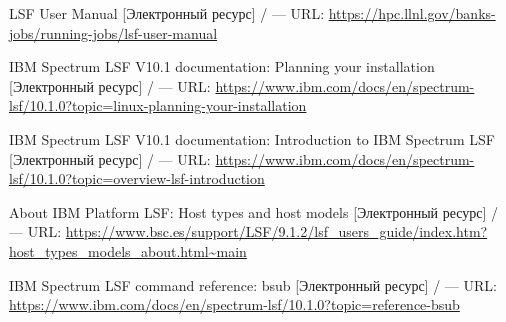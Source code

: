 \begingroup 
\renewcommand{\section}[2]{\anonsection{Библиографический список}}
\begin{thebibliography}{00}




    LSF User Manual
    [Электронный ресурс] /
    --- URL: \url{https://hpc.llnl.gov/banks-jobs/running-jobs/lsf-user-manual}

    IBM Spectrum LSF V10.1 documentation: Planning your installation
    [Электронный ресурс] /
    --- URL: \url{https://www.ibm.com/docs/en/spectrum-lsf/10.1.0?topic=linux-planning-your-installation}

    IBM Spectrum LSF V10.1 documentation: Introduction to IBM Spectrum LSF
    [Электронный ресурс] /
    --- URL: \url{https://www.ibm.com/docs/en/spectrum-lsf/10.1.0?topic=overview-lsf-introduction}

    About IBM Platform LSF: Host types and host models
    [Электронный ресурс] /
    --- URL: \url{https://www.bsc.es/support/LSF/9.1.2/lsf_users_guide/index.htm?host_types_models_about.html~main}

    IBM Spectrum LSF command reference: bsub
    [Электронный ресурс] /
    --- URL: \url{https://www.ibm.com/docs/en/spectrum-lsf/10.1.0?topic=reference-bsub}


\end{thebibliography}
\endgroup

\clearpage